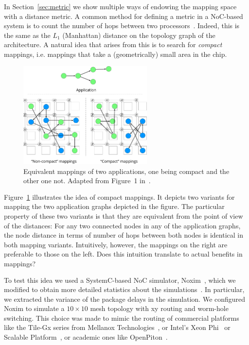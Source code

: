 In Section~\ref{sec:metric} we show multiple ways of endowing the mapping space with a distance metric.
A common method for defining a metric in a \ac{NoC}-based system is to count the number of hops between two processors~\cite{singh2010communication,schwarzer2017symmetry}.
Indeed, this is the same as the $L_1$ (Manhattan) distance on the topology graph of the architecture.
A natural idea that arises from this is to search for \emph{compact} mappings, i.e. mappings that take a (geometrically) small area in the chip.


\begin{figure}[th]
	\centering
	\includegraphics[width=0.6\textwidth]{figures/compact_intro.pdf}
	\caption{Equivalent mappings of two applications, one being compact and the other one not. Adapted from Figure~1 in~\cite{goens_samos19}.}
	\label{fig:compact_intro}
\end{figure}

Figure~\ref{fig:compact_intro} illustrates the idea of compact mappings.
It depicts two variants for mapping the two application graphs depicted in the figure.
The particular property of these two variants is that they are equivalent from the point of view of the distances:
For any two connected nodes in any of the application graphs, the node distance in terms of number of hops between both nodes is identical in both mapping variants.
Intuitively, however, the mappings on the right are preferable to those on the left. 
Does this intuition translate to actual benefits in mappings?

To test this idea we used a SystemC-based \ac{NoC} simulator, Noxim~\cite{noxim}, which we modified to obtain more detailed statistics about the simulations~\cite{goens_samos19}.
In particular, we extracted the variance of the package delays in the simulation. 
We configured Noxim to simulate a $10 \times 10$ mesh topology with xy routing and worm-hole switching. 
This choice was made to mimic the routing of commercial platforms like the Tile-Gx series from Mellanox Technologies~\cite{technologies2015-tile-gx36-processor,technologies2015-tile-gx72-processor}, or Intel's Xeon Phi~\cite{tam2018-skylake-sp} or Scalable Platform~\cite{sodani2016-knights-landing}, or academic ones like OpenPiton~\cite{balkind2016-openpiton}.

